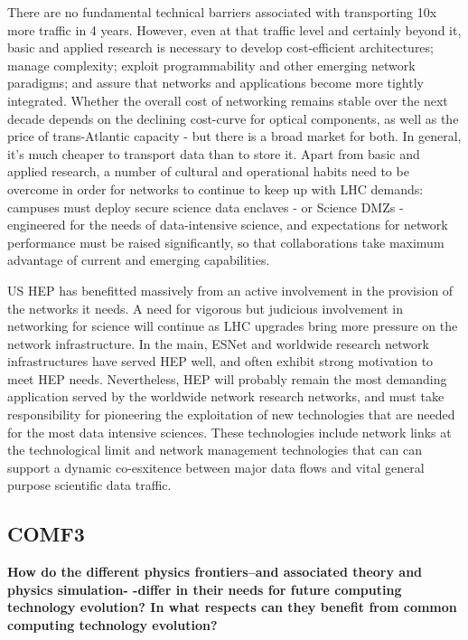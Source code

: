 There are no fundamental technical barriers associated with transporting 10x more traffic in 4 years. However, even at that traffic level and certainly beyond it, basic and applied research is necessary to develop cost-efficient architectures; manage complexity; exploit programmability and other emerging network paradigms; and assure that networks and applications become more tightly integrated.  Whether the overall cost of networking remains stable over the next decade depends on the declining cost-curve for optical components, as well as the price of trans-Atlantic capacity - but there is a broad market for both.  In general, it's much cheaper to transport data than to store it.  Apart from basic and applied research, a number of cultural and operational habits need to be overcome in order for networks to continue to keep up with LHC demands: campuses must deploy secure science data enclaves - or Science DMZs - engineered for the needs of data-intensive science, and expectations for network performance must be raised significantly, so that collaborations take maximum advantage of current and emerging capabilities.


US HEP has benefitted massively from an active involvement in the
provision of the networks it needs.  A need for vigorous but judicious
involvement in networking for science will continue as LHC upgrades bring
more pressure on the network infrastructure.  In the main, ESNet and
worldwide research network infrastructures have served HEP well, and often
exhibit strong motivation to meet HEP needs.  Nevertheless, HEP will
probably remain the most demanding application served by the worldwide
network research networks, and must take responsibility for pioneering the
exploitation of new technologies that are needed for the most data
intensive sciences. These technologies include network links at the
technological limit and network management technologies that can can
support a dynamic co-esxitence between major data flows and vital general
purpose scientific data traffic.


\subsection{COMF3}

{\bf
How do the different physics frontiers--and associated theory and physics simulation-
-differ in their needs for future computing technology evolution? In what respects
can they benefit from common computing technology evolution?}

